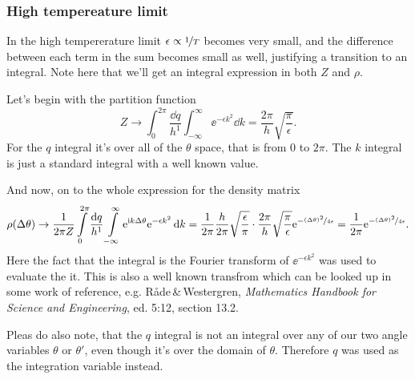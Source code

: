 \documentclass[11pt,letter, swedish, english
]{article}
\begin{document}
\subsubsection{High tempereature limit}
In the high tempererature limit $\epsilon\propto\nicefrac{1}{T}$
becomes very small, and the difference between each term in the sum
becomes small as well, justifying a transition to an integral. Note
here that we'll get an integral expression in both $Z$ and $\rho$.

Let's begin with the partition function
\begin{equation}
Z\to \int_0^{2\pi}\frac{\dd{q}}{h^1}\int_{-\infty}^\infty\ee^{-\epsilon k^2} \dd{k} 
= \frac{2\pi}{h}\sqrt{\frac{\pi}{\epsilon}}.
\end{equation}
For the $q$ integral it's over all of the $\theta$ space, that is from
$0$ to $2\pi$. 
The $k$ integral is just a standard integral with a well known
value. 

And now, on to the whole expression for the density matrix
\begin{equation}\label{eq:4_hi_temp}
\rho(\Delta\theta) \to \frac{1}{2\pi Z}
\int_0^{2\pi}\frac{\dd{q}}{h^1}
\int_{-\infty}^\infty\ee^{\ii k\Delta\theta}\ee^{-\epsilon k^2} \dd{k} 
= \frac{1}{2\pi}\frac{h}{2\pi}\sqrt{\frac{\epsilon}{\pi}}\cdot
\frac{2\pi}{h}\sqrt{\frac{\pi}{\epsilon}}\ee^{-\nicefrac{(\Delta\theta)^2}{4\epsilon}}
= \frac{1}{2\pi}\ee^{-\nicefrac{(\Delta\theta)^2}{4\epsilon}}.
\end{equation}
Here the fact that the integral is the Fourier transform of
$\ee^{-\epsilon k^2}$ was used to evaluate the it. This is also
a well known transfrom which can be looked up in some work of
reference, e.g. Råde\,\&\,Westergren, \textit{Mathematics Handbook for
Science and Engineering}, ed. 5:12, section 13.2.

Pleas do also note, that the $q$ integral is not an integral over
any of our two angle variables $\theta$ or $\theta'$, even though
it's over the domain of $\theta$. Therefore $q$ was used as the
integration variable instead. 
\end{document}

